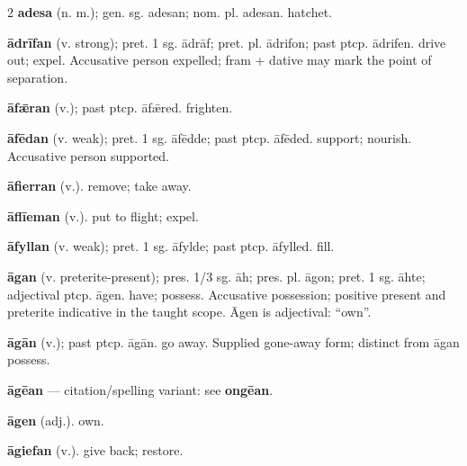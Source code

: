 \begin{multicols*}{2}
\textbf{adesa} (n. m.); gen. sg. adesan; nom. pl. adesan. hatchet.\par
\textbf{ādrīfan} (v. strong); pret. 1 sg. ādrāf; pret. pl. ādrifon; past ptcp. ādrifen. drive out; expel. Accusative person expelled; fram + dative may mark the point of separation.\par
\textbf{āfǣran} (v.); past ptcp. āfǣred. frighten.\par
\textbf{āfēdan} (v. weak); pret. 1 sg. āfēdde; past ptcp. āfēded. support; nourish. Accusative person supported.\par
\textbf{āfierran} (v.). remove; take away.\par
\textbf{āflīeman} (v.). put to flight; expel.\par
\textbf{āfyllan} (v. weak); pret. 1 sg. āfylde; past ptcp. āfylled. fill.\par
\textbf{āgan} (v. preterite-present); pres. 1/3 sg. āh; pres. pl. āgon; pret. 1 sg. āhte; adjectival ptcp. āgen. have; possess. Accusative possession; positive present and preterite indicative in the taught scope. Āgen is adjectival: “own”.\par
\textbf{āgān} (v.); past ptcp. āgān. go away. Supplied gone-away form; distinct from āgan possess.\par
\textbf{āgēan} — citation/spelling variant: see \textbf{ongēan}.\par
\textbf{āgen} (adj.). own.\par
\textbf{āgiefan} (v.). give back; restore.\par

\end{multicols*}
